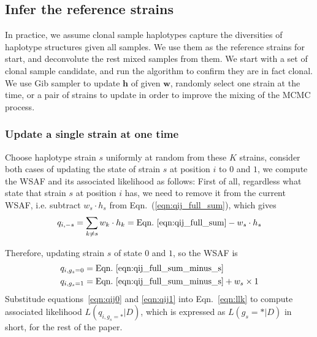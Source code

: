 \documentclass{bioinfo}
\begin{document}
\begin{methods}



\subsection{Infer the reference strains}\label{sec:ref:build}
In practice, we assume clonal sample haplotypes capture the diversities of haplotype structures given all samples. We use them as the reference strains for start, and deconvolute the rest mixed samples from them. We start with a set of clonal sample candidate, and run the algorithm to confirm they are in fact clonal. We use Gib sampler to update $\mathbf h$ of given $\mathbf w$, randomly select one strain at the time, or a pair of strains to update in order to improve the mixing of the MCMC process.

\subsubsection{Update a single strain at one time}

Choose haplotype strain $s$ uniformly at random from these $K$ strains, consider both cases of updating the state of strain $s$ at position $i$ to $0$ and $1$, we compute the WSAF and its associated likelihood as follows: First of all, regardless what state that strain $s$ at position $i$ has, we need to remove it from the current WSAF, i.e. subtract $ w_s \cdot h_s$ from Eqn.~(\ref{eqn:qij_full_sum}), which gives
\begin{equation}
q_{i,-s} = \sum_{k\neq s} w_k \cdot h_k = \textrm{Eqn.~\eqref{eqn:qij_full_sum}} -  w_s \cdot h_s \label{eqn:qij_full_sum_minus_s}
\end{equation}

Therefore, updating strain $s$ of state $0$ and $1$, so the WSAF is
\begin{align}
q_{i,g_s=0} & = \textrm{Eqn.~\eqref{eqn:qij_full_sum_minus_s}} \label{eqn:qij0}\\
q_{i,g_s=1} & = \textrm{Eqn.~\eqref{eqn:qij_full_sum_minus_s}} + w_s \times 1 \label{eqn:qij1}
\end{align}
Substitude equations~\eqref{eqn:qij0} and \eqref{eqn:qij1} into Eqn.~\eqref{eqn:llk} to compute associated likelihood $L(q_{i,g_s=*} |D)$, which is expressed as $L(g_s=* |D)$ in short, for the rest of the paper.



\end{methods}
\end{document}
